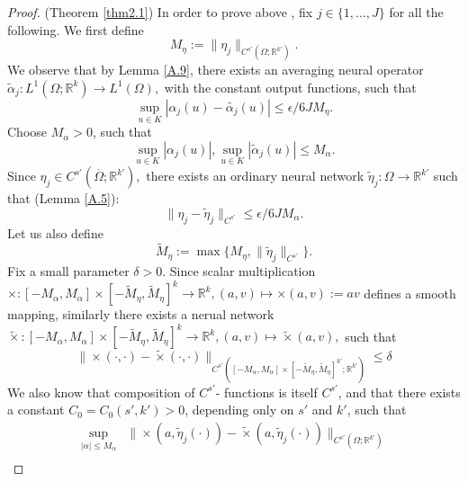 \documentclass[reqno,9pt]{amsart}
\theoremstyle{plain}
\theoremstyle{definition}
\newcommand{\bb}[1]{\mathbb{#1}}
\begin{document}
\begin{proof}{(Theorem \ref{thm2.1})}
    \noindent In order to prove above , fix $j \in \{1,\dots, J\}$ for all the following. We first define
    \begin{equation}
        M_\eta := \|\eta_j\|_{C^{s'}(\Omega;\bb R^{k'})}.
    \end{equation}
    We observe that by Lemma \ref{A.9}, there exists an averaging neural operator $\tilde{\alpha}_j : L^1(\Omega;\bb R^k) \to L^1(\Omega),$ with the constant output functions, such that
    \begin{equation}\label{eq15}
        \sup_{u \in K}|\alpha_j(u) - \tilde{\alpha_j}(u)| \leq \epsilon/6JM_\eta.
    \end{equation}
    Choose $M_\alpha > 0$, such that
    \begin{equation}
        \sup_{u \in K}|\alpha_j(u)|, \sup_{u\in K}|\tilde{\alpha}_j(u)| \leq M_\alpha.
    \end{equation}
    Since $\eta_j\in C^{s'}(\overline{\Omega};\bb R^{k'}),$ there exists an ordinary neural network $\tilde{\eta}_j: \Omega \to \bb R^{k'}$ such that (Lemma \ref{A.5}):
    \begin{equation} \label{eq17}
        \|\eta_j - \tilde{\eta}_j\|_{C^{s'}} \leq \epsilon/6JM_\alpha.
    \end{equation}
    Let us also define 
    \begin{equation}
        \tilde{M}_\eta := \max\{M_\eta,\|\tilde{\eta}_j\|_{C^{s'}}\}.
    \end{equation}
    Fix a small parameter $\delta > 0$. Since scalar multiplication $\times : [-M_\alpha,M_\alpha] \times [-\tilde{M}_\eta, \tilde{M}_\eta]^k \to \bb R^k, (a,v) \mapsto \times(a,v) := av$ defines a smooth mapping, similarly there exists a nerual network $\tilde{\times} : [-M_\alpha,M_\alpha] \times [-\tilde{M}_\eta, \tilde{M}_\eta]^k \to \bb R^k, (a,v) \mapsto \tilde{\times}(a,v),$ such that
    \begin{equation}\label{eq19}
        \|\times(\cdot,\cdot) - \tilde{\times}(\cdot,\cdot)\|_{C^{s'}([-M_\alpha,M_\alpha] \times [-\tilde{M}_\eta, \tilde{M}_\eta]^{k'};\bb R^{k'})} \leq \delta
    \end{equation}
    We also know that composition of $C^{s'}$- functions is itself $C^{s'}$, and that there exists a constant $C_0 = C_0(s',k') > 0$, depending only on $s'$ and $k'$, such that
    $$
    \begin{aligned}
        \sup_{|\alpha| \leq M_\alpha} &\|\times (a,\tilde{\eta}_j(\cdot)) - \tilde{\times}(a,\tilde{\eta}_j(\cdot))\|_{C^{s'}(\Omega;\bb R^{k'})}\\

\end{aligned}$$
\end{proof}
\end{document}
